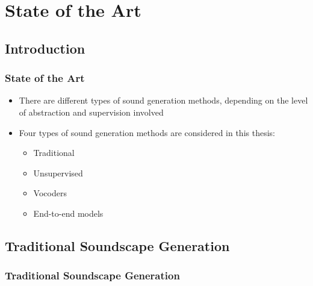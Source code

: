 \section{State of the Art}

\subsection{Introduction}
\begin{frame}
    \frametitle{State of the Art}
    \begin{itemize}
        \item There are different types of sound generation methods, depending on the level of abstraction and supervision involved
        \item Four types of sound generation methods are considered in this thesis:
              \begin{itemize}
                  \item Traditional
                  \item Unsupervised
                  \item Vocoders
                  \item End-to-end models
              \end{itemize}
    \end{itemize}
\end{frame}

\subsection{Traditional Soundscape Generation}

\begin{frame}
    \frametitle{Traditional Soundscape Generation}

\end{frame}

